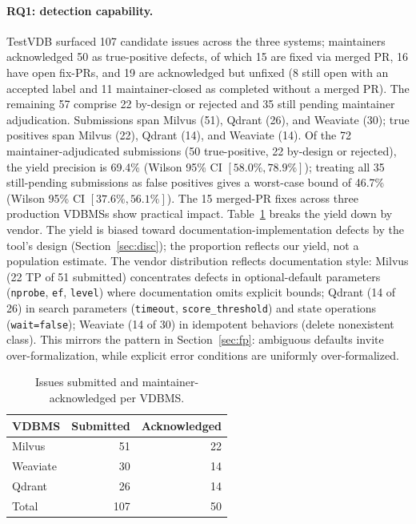 \documentclass[sigconf]{acmart}
\begin{document}
\paragraph{RQ1: detection capability.}
TestVDB surfaced 107 candidate issues across the three systems; maintainers acknowledged 50 as true-positive defects, of which 15 are fixed via merged PR, 16 have open fix-PRs, and 19 are acknowledged but unfixed (8 still open with an accepted label and 11 maintainer-closed as completed without a merged PR). The remaining 57 comprise 22 by-design or rejected and 35 still pending maintainer adjudication. Submissions span Milvus (51), Qdrant (26), and Weaviate (30); true positives span Milvus (22), Qdrant (14), and Weaviate (14). Of the 72 maintainer-adjudicated submissions (50 true-positive, 22 by-design or rejected), the yield precision is 69.4\% (Wilson 95\% CI $[58.0\%, 78.9\%]$); treating all 35 still-pending submissions as false positives gives a worst-case bound of 46.7\% (Wilson 95\% CI $[37.6\%, 56.1\%]$). The 15 merged-PR fixes across three production VDBMSs show practical impact. Table~\ref{tab:yield} breaks the yield down by vendor. The yield is biased toward documentation-implementation defects by the tool's design (Section~\ref{sec:disc}); the proportion reflects our yield, not a population estimate. The vendor distribution reflects documentation style: Milvus (22 TP of 51 submitted) concentrates defects in optional-default parameters (\texttt{nprobe}, \texttt{ef}, \texttt{level}) where documentation omits explicit bounds; Qdrant (14 of 26) in search parameters (\texttt{timeout}, \texttt{score\_threshold}) and state operations (\texttt{wait=false}); Weaviate (14 of 30) in idempotent behaviors (delete nonexistent class). This mirrors the pattern in Section~\ref{sec:fp}: ambiguous defaults invite over-formalization, while explicit error conditions are uniformly over-formalized.

\begin{table}[t]
\caption{Issues submitted and maintainer-acknowledged per VDBMS.}
\label{tab:yield}
\small
\begin{tabular}{@{}lrr@{}}
\toprule
VDBMS & Submitted & Acknowledged \\
\midrule
Milvus & 51 & 22 \\
Weaviate & 30 & 14 \\
Qdrant & 26 & 14 \\
\midrule
Total & 107 & 50 \\
\bottomrule
\end{tabular}
\end{table}
\end{document}
